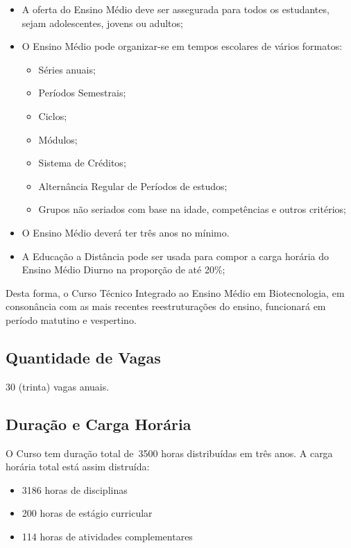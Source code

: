 \documentclass[11pt,fleqn]{book} %
\newcommand{\VER}[1]{\begingroup\color{red}#1\endgroup}
\begin{document}
\begin{itemize}
	\item A oferta do Ensino Médio deve ser assegurada para todos os estudantes, sejam adolescentes,
	jovens ou adultos;
	\item O Ensino Médio pode organizar-se em tempos escolares de vários formatos:
	\begin{itemize}
		\item Séries anuais;
		\item Períodos Semestrais;
		\item Ciclos;
		\item Módulos;
		\item Sistema de Créditos;
		\item Alternância Regular de Períodos de estudos;
		\item Grupos não seriados com base na idade, competências e outros critérios;
	\end{itemize}
	\item O Ensino Médio deverá ter três anos no mínimo.
	\item A Educação a Distância pode ser usada para compor a carga horária do Ensino Médio Diurno na proporção de até 20\%;
\end{itemize}

Desta forma, o Curso Técnico Integrado ao Ensino Médio em Biotecnologia, em consonância com as mais recentes reestruturações do ensino, funcionará em período matutino e vespertino.

\subsection{Quantidade de Vagas}
\indent

30 (trinta) vagas anuais. 

\subsection{Duração e Carga Horária}
\indent

O Curso tem duração total de~\VER{3500} horas distribuídas em três anos.
A carga horária total está assim distruída:
\begin{itemize}
	\item \VER{3186} horas de disciplinas
	\item \VER{200} horas de estágio curricular
	\item \VER{114} horas de atividades complementares
\end{itemize}
\end{document}

